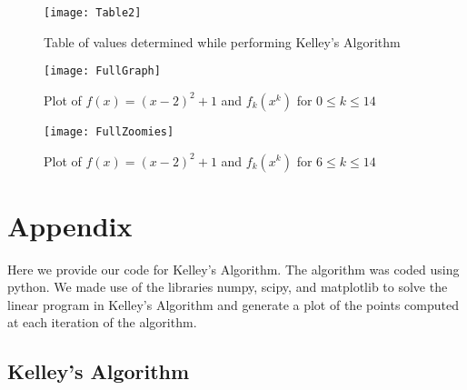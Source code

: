 \documentclass[11pt]{article}
\theoremstyle{definition}
\begin{document}
\begin{figure}[h!]
\texttt{[image: Table2]}
\centering
\caption{Table of values determined while performing Kelley's Algorithm}
\end{figure}

\begin{figure}[h!]
\texttt{[image: FullGraph]}
\centering
\caption{Plot of $f(x) = (x-2)^2 + 1$ and $f_k(x^k)$ for $0 \leq k \leq 14$}
\end{figure}

\begin{figure}[h!]
\texttt{[image: FullZoomies]}
\centering
\caption{Plot of $f(x) = (x-2)^2 + 1$ and $f_k(x^k)$ for $6 \leq k \leq 14$}
\end{figure}





\newpage
\section*{Appendix}

Here we provide our code for Kelley's Algorithm. The algorithm was coded using python. We made use of the libraries numpy, scipy, and matplotlib to solve the linear program in Kelley's Algorithm and generate a plot of the points computed at each iteration of the algorithm.

\subsection*{Kelley's Algorithm}
\end{document}
